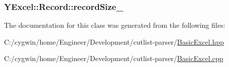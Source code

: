 \subsubsection[{record\+Size\+\_\+}]{ Y\+Excel\+::\+Record\+::record\+Size\+\_\+}\label{class_y_excel_1_1_record_a4d726030a31687be0637f0a51f5877dd}


The documentation for this class was generated from the following files\+:\begin{DoxyCompactItemize}
\item 
C\+:/cygwin/home/\+Engineer/\+Development/cutlist-\/parser/\hyperlink{_basic_excel_8hpp}{Basic\+Excel.\+hpp}\item 
C\+:/cygwin/home/\+Engineer/\+Development/cutlist-\/parser/\hyperlink{_basic_excel_8cpp}{Basic\+Excel.\+cpp}\end{DoxyCompactItemize}
